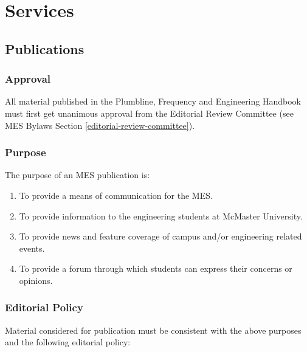 \section{Services}
\label{services}

\subsection{Publications}
\label{publications}

\subsubsection{Approval}
\label{approval}
All material published in the Plumbline, Frequency and Engineering
Handbook must first get unanimous approval from the Editorial Review
Committee (see MES Bylaws Section \ref{editorial-review-committee}).

\subsubsection{Purpose}
\label{purpose}
The purpose of an MES publication is:

\begin{enumerate}
 \item
  To provide a means of communication for the MES.
 \item
  To provide information to the engineering students at McMaster
  University.
 \item
  To provide news and feature coverage of campus and/or engineering
  related events.
 \item
  To provide a forum through which students can express their concerns
  or opinions.

\end{enumerate}

\subsubsection{Editorial Policy}
\label{editorial-policy}
Material considered for publication must be consistent with the above
purposes and the following editorial policy:

